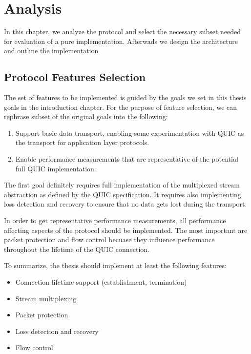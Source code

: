 \chapter{Analysis}\label{chap:03-analysis}

In this chapter, we analyze the protocol and select the necessary subset needed for evaluation of a
pure \dotnet{} implementation. Afterwads we design the architecture and outline the implementation

\section{Protocol Features Selection}

The set of features to be implemented is guided by the goals we set in this thesis goals in the
introduction chapter. For the purpose of feature selection, we can rephrase subset of the original
goals into the following:


\begin{enumerate}

  \item Support basic data transport, enabling some experimentation with QUIC as the transport for
    application layer protocols.

  \item Enable performance measurements that are representative of the potential full QUIC
    implementation.

\end{enumerate}

The first goal definitely requires full implementation of the multiplexed stream abstraction as
defined by the QUIC specification. It requires also implementing loss detection and recovery to
ensure that no data gets lost during the transport.

In order to get representative performance measurements, all performance affecting aspects of the
protocol should be implemented. The most important are packet protection and flow control becuase
they influence performance throughout the lifetime of the QUIC connection.

To summarize, the thesis should implement at least the following features:

\begin{itemize}

    \item Connection lifetime support (establishment, termination)

    \item Stream multiplexing

    \item Packet protection

    \item Loss detection and recovery

    \item Flow control

\end{itemize}

